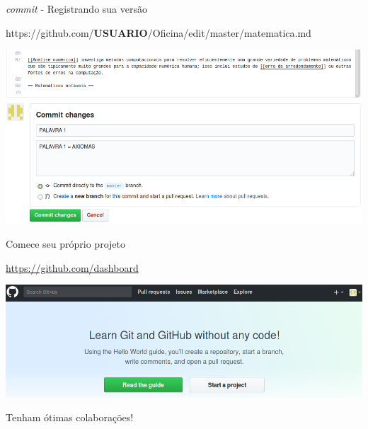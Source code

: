 \documentclass{beamer}
\begin{document}
\begin{frame}{{\it commit} - Registrando sua versão}
  \begin{center}
    https://github.com/{\bf USUARIO}/Oficina/edit/master/matematica.md

    \includegraphics[scale=0.3]{./figs/commit_GitHub.png}
  \end{center}
\end{frame}



\begin{frame}{Comece seu próprio projeto}
  \begin{center}
    \url{https://github.com/dashboard}
    
    \includegraphics[scale=0.3]{./figs/Start_a_project_GitHub.png}
  \end{center}
\end{frame}

\begin{frame}
  \vspace{1cm}
  \begin{center}
    {\Huge Tenham ótimas colaborações!}
  \end{center}
\end{frame}
\end{document}
